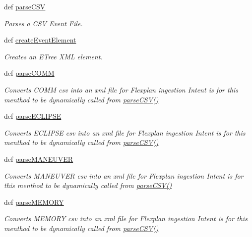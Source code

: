 \begin{DoxyCompactItemize}
def \hyperlink{namespace_parse_events_a09ebba26849e0a43ded60804c8953a2c}{parse\-C\-S\-V}
\begin{DoxyCompactList}\small\item\em Parses a C\-S\-V Event File. \end{DoxyCompactList}\item 
def \hyperlink{namespace_parse_events_a10703d4160f8f5428f3718df422e97a0}{create\-Event\-Element}
\begin{DoxyCompactList}\small\item\em Creates an E\-Tree X\-M\-L element. \end{DoxyCompactList}\item 
def \hyperlink{namespace_parse_events_adc5a20ae407ba5bf60682ca51b84750c}{parse\-C\-O\-M\-M}
\begin{DoxyCompactList}\small\item\em Converts C\-O\-M\-M csv into an xml file for Flexplan ingestion Intent is for this menthod to be dynamically called from {\ttfamily \hyperlink{namespace_parse_events_a09ebba26849e0a43ded60804c8953a2c}{parse\-C\-S\-V()}} \end{DoxyCompactList}\item 
def \hyperlink{namespace_parse_events_a647067642e925ceb7ca3bc61d25b5923}{parse\-E\-C\-L\-I\-P\-S\-E}
\begin{DoxyCompactList}\small\item\em Converts E\-C\-L\-I\-P\-S\-E csv into an xml file for Flexplan ingestion Intent is for this menthod to be dynamically called from {\ttfamily \hyperlink{namespace_parse_events_a09ebba26849e0a43ded60804c8953a2c}{parse\-C\-S\-V()}} \end{DoxyCompactList}\item 
def \hyperlink{namespace_parse_events_af3991db0839e91cc5f294c8ab35bc5fb}{parse\-M\-A\-N\-E\-U\-V\-E\-R}
\begin{DoxyCompactList}\small\item\em Converts M\-A\-N\-E\-U\-V\-E\-R csv into an xml file for Flexplan ingestion Intent is for this menthod to be dynamically called from {\ttfamily \hyperlink{namespace_parse_events_a09ebba26849e0a43ded60804c8953a2c}{parse\-C\-S\-V()}} \end{DoxyCompactList}\item 
def \hyperlink{namespace_parse_events_a34df00eb119ffd8a2ffd0074a3051ccb}{parse\-M\-E\-M\-O\-R\-Y}
\begin{DoxyCompactList}\small\item\em Converts M\-E\-M\-O\-R\-Y csv into an xml file for Flexplan ingestion Intent is for this menthod to be dynamically called from {\ttfamily \hyperlink{namespace_parse_events_a09ebba26849e0a43ded60804c8953a2c}{parse\-C\-S\-V()}} \end{DoxyCompactList}\item 

\end{DoxyCompactItemize}
